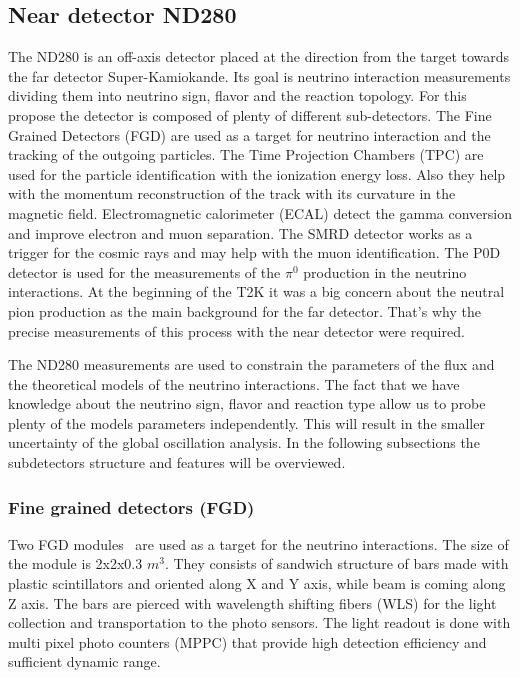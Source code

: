 \documentclass[../main.tex]{subfiles}
\begin{document}
\subsection{Near detector ND280}
\label{sec:T2K:nd280}
The ND280 is an off-axis detector placed at the direction from the target towards the far detector Super-Kamiokande. Its goal is neutrino interaction measurements dividing them into neutrino sign, flavor and the reaction topology. For this propose the detector is composed of plenty of different sub-detectors. The Fine Grained Detectors (FGD) are used as a target for neutrino interaction and the tracking of the outgoing particles. The Time Projection Chambers (TPC) are used for the particle identification with the ionization energy loss. Also they help with the momentum reconstruction of the track with its curvature in the magnetic field. Electromagnetic calorimeter (ECAL) detect the gamma conversion and improve electron and muon separation. The SMRD detector works as a trigger for the cosmic rays and may help with the muon identification. The P0D detector is used for the measurements of the $\pi^0$ production in the neutrino interactions. At the beginning of the T2K it was a big concern about the neutral pion production as the main background for the far detector. That's why the precise measurements of this process with the near detector were required.

The ND280 measurements are used to constrain the parameters of the flux and the theoretical models of the neutrino interactions. The fact that we have knowledge about the neutrino sign, flavor and reaction type allow us to probe plenty of the models parameters independently. This will result in the smaller uncertainty of the global oscillation analysis. In the following subsections the subdetectors structure and features will be overviewed.

\subsubsection{Fine grained detectors (FGD)}
Two FGD modules~\cite{Amaudruz2012} are used as a target for the neutrino interactions. The size of the module is 2x2x0.3 $m^3$. They consists of sandwich structure of bars made with plastic scintillators and oriented along X and Y axis, while beam is coming along Z axis. The bars are pierced with wavelength shifting fibers (WLS) for the light collection and transportation to the photo sensors. The light readout is done with multi pixel photo counters (MPPC) that provide high detection efficiency and sufficient dynamic range.
\end{document}
